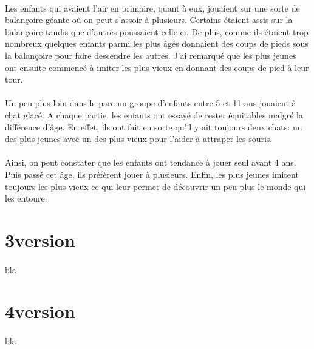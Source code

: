 \paragraph{} Les enfants qui avaient l'air en primaire, quant à eux, jouaient
sur une sorte de balançoire géante où on peut s'assoir à plusieurs. Certains
étaient assis sur la balançoire tandis que d'autres poussaient celle-ci. De
plus, comme ils étaient trop nombreux quelques enfants parmi les plus âgés
donnaient des coups de pieds sous la balançoire pour faire descendre les
autres. J'ai remarqué que les plus jeunes ont ensuite commencé à imiter les
plus vieux en donnant des coups de pied à leur tour.

\paragraph{} Un peu plus loin dans le parc un groupe d'enfants entre 5 et 11
ans jouaient à chat glacé. A chaque partie, les enfants ont essayé de rester
équitables malgré la différence d'âge. En effet, ils ont fait en sorte qu'il y
ait toujours deux chats: un des plus jeunes avec un des plus vieux pour l'aider
à attraper les souris.

\paragraph{} Ainsi, on peut constater que les enfants ont tendance à jouer seul
avant 4 ans. Puis passé cet âge, ils préfèrent jouer à plusieurs. Enfin, les
plus jeunes imitent toujours les plus vieux ce qui leur permet de découvrir un
peu plus le monde qui les entoure.

\section{3\ieme version}

\paragraph{}
bla

\section{4\ieme version}

\paragraph{}
bla
